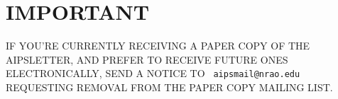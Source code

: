 

\newcommand{\AMark}{AIPSMark$^{(93)}$}
\newcommand{\AMarks}{AIPSMarks$^{(93)}$}
\newcommand{\LMark}{AIPSLoopMark$^{(93)}$}
\newcommand{\LMarks}{AIPSLoopMarks$^{(93)}$}
\newcommand{\AM}{A_m^{(93)}}
\newcommand{\ALM}{AL_m^{(93)}}

\newcommand{\AIPRELEASE}{April 15, 1997}
\newcommand{\AIPVOLUME}{Volume XVII}
\newcommand{\AIPNUMBER}{Number 1}
\newcommand{\RELEASENAME}{{\tt 15APR97}}
\newcommand{\OLDNAME}{{\tt 15OCT96}}
\newcommand{\NEXTNAME}{{\tt 15OCT97}}




\newcommand{\MYSpace}{-11pt}

\normalstyle

\section{IMPORTANT}

IF YOU'RE CURRENTLY RECEIVING A PAPER COPY OF THE AIPSLETTER, AND
PREFER TO RECEIVE FUTURE ONES ELECTRONICALLY, SEND A NOTICE TO {\tt
aipsmail@nrao.edu} REQUESTING REMOVAL FROM THE PAPER COPY MAILING
LIST.


